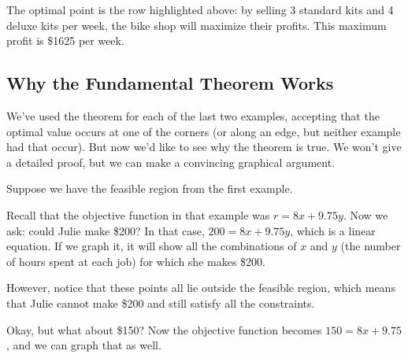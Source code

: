 The optimal point is the row highlighted above: by selling 3 standard kits and 4 deluxe kits per week, the bike shop will maximize their profits.  This maximum profit is \$1625 per week.
\vfill
\pagebreak

\subsection{Why the Fundamental Theorem Works}
We've used the theorem for each of the last two examples, accepting that the optimal value occurs at one of the corners (or along an edge, but neither example had that occur).  But now we'd like to see why the theorem is true.  We won't give a detailed proof, but we can make a convincing graphical argument.

Suppose we have the feasible region from the first example.
\begin{center}
\end{center}

Recall that the objective function in that example was $r=8x+9.75y$.  Now we ask: could Julie make \$200?  In that case, $200=8x+9.75y$, which is a linear equation.  If we graph it, it will show all the combinations of $x$ and $y$ (the number of hours spent at each job) for which she makes \$200.

However, notice that these points all lie outside the feasible region, which means that Julie cannot make \$200 and still satisfy all the constraints.

Okay, but what about \$150?  Now the objective function becomes $150=8x+9.75$, and we can graph that as well.

